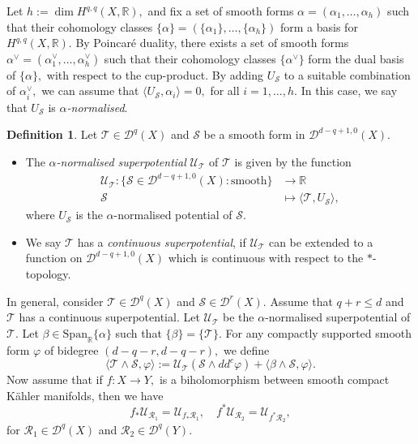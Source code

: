 \documentclass[11pt]{amsart}
\theoremstyle{definition}
\newtheorem{definition}[theorem]{Definition}
\newcommand{\R}{\mathbb{R}}
\newcommand{\lto}{\longrightarrow}
\newcommand{\lmto}{\longmapsto}
\newcommand{\sD}{\mathscr{D}}
\newcommand{\sU}{\mathscr{U}}
\newcommand{\sT}{\mathscr{T}}
\newcommand{\sR}{\mathscr{R}}
\newcommand{\sS}{\mathscr{S}}
\begin{document}
\vskip 2mm
Let $h:= \dim H^{q,q}(X, \R),$ and fix a set of smooth forms $\alpha = (\alpha_1, \dots , \alpha_{h})$  such that their cohomology classes $\{ \alpha \}= (\{\alpha_1 \}, \dots , \{\alpha_{h}\})$ form a basis for $H^{q,q}(X, \R).$ By Poincar\'e duality, there exists a set of smooth forms $\alpha^{\vee} = ( \alpha_1^{\vee} , \dots , \alpha_{h}^{\vee})$ such that their cohomology classes $\{ \alpha^{\vee}\}$ form the dual basis of $\{\alpha\},$ with respect to the cup-product. By adding $U_{\sS}$ to a suitable combination of $\alpha_i^{\vee},$ we can assume that $\langle U_{\sS} , \alpha_i \rangle =0,$ for all $i = 1, \dots, h.$ In this case, we say that $U_{\sS}$ is \emph{$\alpha$-normalised}. 
\begin{definition}\label{def:CSP}
Let $\sT \in \sD^{q}(X)$ and $\sS$ be a smooth form in $\sD^{d-q+1,0}(X).$ 
\begin{itemize}
    \item [(a)] The \emph{$\alpha$-normalised superpotential}  $\mathscr{U}_{\sT}$ of $\sT$ is given by the function 
\begin{align*}
    \sU_{\sT}  :\{ \sS \in \sD^{d-q+1,0}(X): \text{smooth} \} & \lto \R  \\ 
     \sS &\lmto \langle \sT , U_{\sS} \rangle,
\end{align*}
where $U_{\sS}$ is the $\alpha$-normalised potential of $\sS.$
    \item [(b)] We say $\sT$ has a \emph{continuous superpotential}, if $\sU_{\sT}$ can be extended to a function on $\sD^{d-q+1, 0}(X)$ which is continuous with respect to the $*$-topology. 
\end{itemize}

\end{definition}


In general, consider $\sT \in \sD^q(X)$ and $\sS \in \sD^r(X).$ Assume that $q+r \leq d$ and $\sT$ has a continuous superpotential. Let $\sU_{\sT}$ be the $\alpha$-normalised superpotential of $\sT.$ Let $\beta \in \text{Span}_{\R}\{\alpha\}$ such that $ \{\beta \} = \{\sT \}.$ For any compactly supported smooth form $\varphi$ of bidegree $(d-q-r, d-q-r),$ we define 
\begin{equation}\label{eq:sp-formula}
    \langle \sT \wedge \sS , \varphi \rangle := \sU_{\sT}(  \sS \wedge dd^c \varphi) + \langle \beta \wedge \sS , \varphi  \rangle. 
\end{equation}
Now assume that if $f: X \lto Y,$ is a biholomorphism  between smooth compact K\"ahler manifolds, then we have
$$
 f_* \sU_{\sR_1} = \sU_{f_* \sR_1}, \quad   f^* \sU_{\sR_2} = \sU_{f^* \sR_2},
$$
for $\sR_1 \in \sD^{q}(X)$ and $\sR_2 \in \sD^{q}(Y).$
\end{document}
